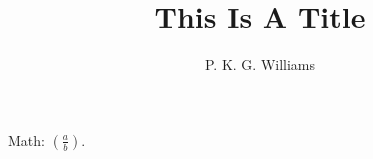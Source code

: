 \documentclass{article}
\title{This Is A Title}
\author{P. K. G. Williams}
\begin{document}
Math: $\left(\frac{a}{b}\right)$.
\end{document}
